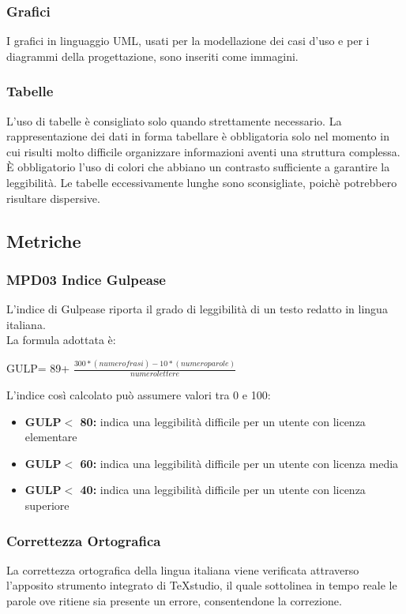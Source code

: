 \subsubsection{Grafici}
I grafici in linguaggio UML, usati per la modellazione dei casi d’uso e per i diagrammi della progettazione, sono inseriti come immagini.
\subsubsection{Tabelle}
L’uso di tabelle è consigliato solo quando strettamente necessario. La rappresentazione dei dati in forma tabellare è obbligatoria solo nel momento in cui risulti molto difficile organizzare informazioni aventi una struttura complessa.
È obbligatorio l’uso di colori che abbiano un contrasto sufficiente a garantire la leggibilità. Le tabelle eccessivamente lunghe sono sconsigliate, poichè potrebbero risultare dispersive.
\subsection{Metriche}
\subsubsection{MPD03 Indice Gulpease}
L'indice di Gulpease riporta il grado di leggibilità di un testo redatto in lingua italiana.
\\La formula adottata è:
\begin{center}
GULP= 89+ $\frac{300*(numero frasi)-10*(numero parole)}{numero lettere}$
\end{center}
L'indice così calcolato può assumere valori tra 0 e 100:
\begin{itemize}
\item \textbf{GULP$<$ 80:} indica una leggibilità difficile per un utente con licenza elementare
\item \textbf{GULP$<$ 60:} indica una leggibilità difficile per un utente con licenza media
\item \textbf{GULP$<$ 40:} indica una leggibilità difficile per un utente con licenza superiore
\end{itemize}

\subsubsection{Correttezza Ortografica}
La correttezza ortografica della lingua italiana viene verificata attraverso l'apposito strumento integrato di \TeX studio, il quale sottolinea in tempo reale le parole ove ritiene sia presente un errore, consentendone la correzione.
